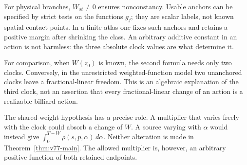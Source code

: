 For physical branches, $W_{st}\ne0$ ensures nonconstancy.  Usable
anchors can be specified by strict tests on the functions $g_j$; they
are scalar labels, not known spatial contact points.  In a finite atlas
one fixes such anchors and retains a positive margin after shrinking the
class.  An arbitrary additive constant in an action is not harmless:
the three absolute clock values are what determine it.

For comparison, when $W(z_0)$ is known, the second formula needs only
two clocks.  Conversely, in the unrestricted weighted-function model
two unanchored clocks leave a fractional-linear freedom.  This is an
algebraic explanation of the third clock, not an assertion that every
fractional-linear change of an action is a realizable billiard action.

The shared-weight hypothesis has a precise role.  A multiplier that
varies freely with the clock could absorb a change of $W$.  A source
varying with $\alpha$ would instead give
$\int_0^{T-W}\rho(s,p,\alpha)\,d\alpha$.  Neither alteration is
made in Theorem~\ref{thm:v77-main}.  The allowed multiplier is,
however, an arbitrary positive function of both retained endpoints.
